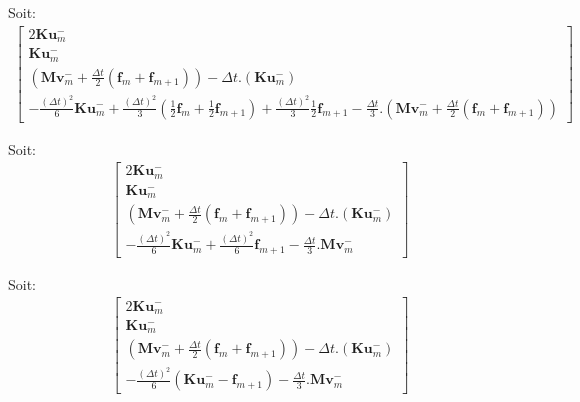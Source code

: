 \documentclass[12pt,a4paper]{report}
\begin{document}
Soit:
\begin{equation}
\begin{array}{c}
	\begin{bmatrix}	
		  		2 \mathbf{K} \mathbf{u}_m^-
		\\ \mathbf{K} \mathbf{u}_m^-
		\\ 	\left( \mathbf{M} \mathbf{v}_m^-
		     			+\frac{\Delta t}{2}  (\mathbf{f}_m + \mathbf{f}_{m+1})
			  \right)
			-\Delta t.
			 \left( \mathbf{K} \mathbf{u}_m^-
			  \right)
		\\ -\frac{(\Delta t)^2}{6}
				\mathbf{K} \mathbf{u}_m^- 
			 
			+ \frac{(\Delta t)^2}{3}
					\left( \frac{1}{2} 
								\mathbf{f}_m 
							+ \frac{1}{2}\mathbf{f}_{m+1}
					\right)
			+ \frac{(\Delta t)^2}{3}  \frac{1}{2}\mathbf{f}_{m+1}
					  
			- \frac{\Delta t}{3} .
				\left( \mathbf{M} \mathbf{v}_m^-
		     				+\frac{\Delta t}{2}  
		     					(\mathbf{f}_m + \mathbf{f}_{m+1})
		     	\right)
	\end{bmatrix}
\end{array}
\end{equation}

Soit:
\begin{equation}
\begin{array}{c}
	\begin{bmatrix}	
		  		2 \mathbf{K} \mathbf{u}_m^-
		\\ \mathbf{K} \mathbf{u}_m^-
		\\ 	\left( \mathbf{M} \mathbf{v}_m^-
		     			+\frac{\Delta t}{2}  (\mathbf{f}_m + \mathbf{f}_{m+1})
			  \right)
			-\Delta t.
			 \left( \mathbf{K} \mathbf{u}_m^-
			  \right)
		\\ -\frac{(\Delta t)^2}{6}
				\mathbf{K} \mathbf{u}_m^- 
				
			+ \frac{(\Delta t)^2}{6} \mathbf{f}_{m+1}
					  
			- \frac{\Delta t}{3} .  \mathbf{M} \mathbf{v}_m^-
	\end{bmatrix}
\end{array}
\end{equation}

Soit:
\begin{equation}
\begin{array}{c}
	\begin{bmatrix}	
		  		2 \mathbf{K} \mathbf{u}_m^-
		\\ \mathbf{K} \mathbf{u}_m^-
		\\ 	\left( \mathbf{M} \mathbf{v}_m^-
		     			+\frac{\Delta t}{2}  (\mathbf{f}_m + \mathbf{f}_{m+1})
			  \right)
			-\Delta t.
			 \left( \mathbf{K} \mathbf{u}_m^-
			  \right)
		\\ -\frac{(\Delta t)^2}{6}
				\left( \mathbf{K} \mathbf{u}_m^- 
						-\mathbf{f}_{m+1}
				\right)
					  
			- \frac{\Delta t}{3} . \mathbf{M} \mathbf{v}_m^-
	\end{bmatrix}
\end{array}
\end{equation}
\end{document}
